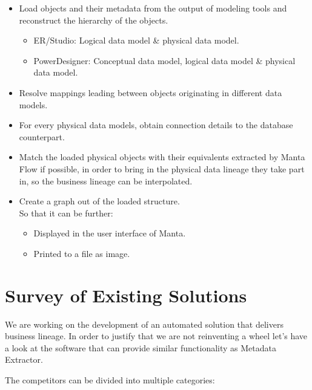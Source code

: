 \begin{itemize}
	\item Load objects and their metadata from the output of modeling tools and reconstruct the hierarchy of the objects.
	\begin{itemize}
		\item ER/Studio: Logical data model \& physical data model.
		\item PowerDesigner:  Conceptual data model, logical data model \& physical data model.
	\end{itemize}
	\item Resolve mappings leading between objects originating in different data models.
	\item For every physical data models, obtain connection details to the database counterpart.
	\item Match the loaded physical objects with their equivalents extracted by Manta Flow if possible, in order to bring in the physical data lineage they take part in, so the business lineage can be interpolated.
	\item Create a graph out of the loaded structure. \\
	So that it can be further:
	\begin{itemize}
		\item Displayed in the user interface of Manta.
		\item Printed to a file as image.
	\end{itemize}
\end{itemize}


\section{Survey of Existing Solutions}

We are working on the development of an automated solution that delivers business lineage.
In order to justify that we are not reinventing a wheel let's have a look at the software that can provide similar functionality as Metadata Extractor.

The competitors can be divided into multiple categories:

